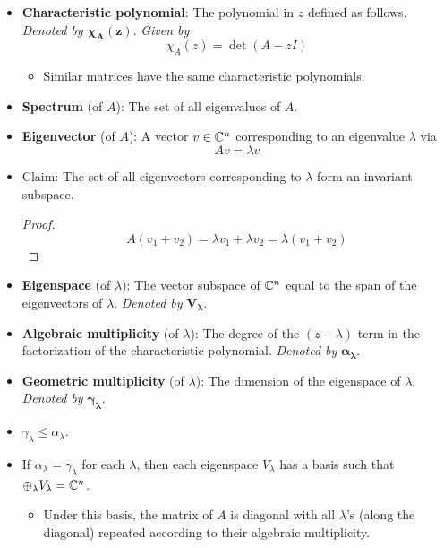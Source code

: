 \documentclass[../notes.tex]{subfiles}
\begin{document}
\begin{itemize}
\begin{itemize}
    \end{itemize}
    \item \textbf{Characteristic polynomial}: The polynomial in $z$ defined as follows. \emph{Denoted by} $\bm{\chi_A(z)}$. \emph{Given by}
    \begin{equation*}
        \chi_A(z) = \det(A-zI)
    \end{equation*}
    \begin{itemize}
        \item Similar matrices have the same characteristic polynomials.
    \end{itemize}
    \item \textbf{Spectrum} (of $A$): The set of all eigenvalues of $A$.
    \item \textbf{Eigenvector} (of $A$): A vector $v\in\mathbb{C}^n$ corresponding to an eigenvalue $\lambda$ via
    \begin{equation*}
        Av = \lambda v
    \end{equation*}
    \item Claim: The set of all eigenvectors corresponding to $\lambda$ form an invariant subspace.
    \begin{proof}
        \begin{equation*}
            A(v_1+v_2) = \lambda v_1+\lambda v_2
            = \lambda(v_1+v_2)
        \end{equation*}
    \end{proof}
    \item \textbf{Eigenspace} (of $\lambda$): The vector subspace of $\mathbb{C}^n$ equal to the span of the eigenvectors of $\lambda$. \emph{Denoted by} $\bm{V_\lambda}$.
    \item \textbf{Algebraic multiplicity} (of $\lambda$): The degree of the $(z-\lambda)$ term in the factorization of the characteristic polynomial. \emph{Denoted by} $\bm{\alpha_\lambda}$.
    \item \textbf{Geometric multiplicity} (of $\lambda$): The dimension of the eigenspace of $\lambda$. \emph{Denoted by} $\bm{\gamma_\lambda}$.
    \item $\gamma_\lambda\leq\alpha_\lambda$.
    \item If $\alpha_\lambda=\gamma_\lambda$ for each $\lambda$, then each eigenspace $V_\lambda$ has a basis such that $\oplus_\lambda V_\lambda=\mathbb{C}^n$.
    \begin{itemize}
        \item Under this basis, the matrix of $A$ is diagonal with all $\lambda$'s (along the diagonal) repeated according to their algebraic multiplicity.

\end{itemize}
\end{itemize}
\end{document}
